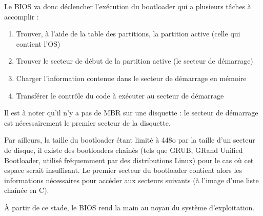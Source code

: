 Le BIOS va donc déclencher l'exécution du bootloader qui a plusieurs tâches à accomplir : 
\begin{enumerate}
	\item Trouver, à l'aide de la table des partitions, la partition active (celle qui contient l'OS)
    \item Trouver le secteur de début de la partition active (le secteur de démarrage)
    \item Charger l'information contenue dans le secteur de démarrage en mémoire
    \item Transférer le contrôle du code à exécuter au secteur de démarrage
\end{enumerate}

Il est à noter qu'il n'y a pas de MBR sur une disquette : le secteur de démarrage est nécessairement le premier secteur de la disquette. 

Par ailleurs, la taille du bootloader étant limité à 448o par la taille d'un secteur de disque, il existe des bootloaders chaînés (tels que GRUB, GRand Unified Bootloader, utilisé fréquemment par des distributions Linux) pour le cas où cet espace serait insuffisant. Le premier secteur du bootloader contient alors les informations nécessaires pour accéder aux secteurs suivants (à l'image d'une liste chaînée en C). 

À partir de ce stade, le BIOS rend la main au noyau du système d'exploitation. 